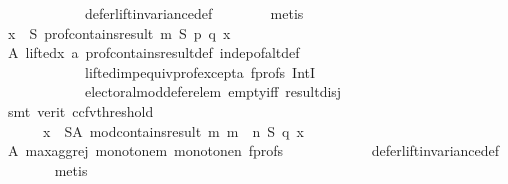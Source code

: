 \begin{isabellebody}
\ \ \ \ \ \ \ \ \ \ \ \ defer{\isacharunderscore}{\kern0pt}lift{\isacharunderscore}{\kern0pt}invariance{\isacharunderscore}{\kern0pt}def\isanewline
\ \ \ \ \ \ \isamarkupfalse%
\ metis\isanewline
\ \ \ \ \isamarkupfalse%
\ \isamarkupfalse%
\ {\isachardoublequoteopen}{\isasymforall}x\ {\isasymin}\ S{\isachardot}{\kern0pt}\ prof{\isacharunderscore}{\kern0pt}contains{\isacharunderscore}{\kern0pt}result\ m\ S\ p\ q\ x{\isachardoublequoteclose}\isanewline
\ \ \ \ \ \ \isamarkupfalse%
\ A\ lifted{\isacharunderscore}{\kern0pt}x\ a{}\ prof{\isacharunderscore}{\kern0pt}contains{\isacharunderscore}{\kern0pt}result{\isacharunderscore}{\kern0pt}def\ indep{\isacharunderscore}{\kern0pt}of{\isacharunderscore}{\kern0pt}alt{\isacharunderscore}{\kern0pt}def\isanewline
\ \ \ \ \ \ \ \ \ \ \ \ lifted{\isacharunderscore}{\kern0pt}imp{\isacharunderscore}{\kern0pt}equiv{\isacharunderscore}{\kern0pt}prof{\isacharunderscore}{\kern0pt}except{\isacharunderscore}{\kern0pt}a\ f{\isacharunderscore}{\kern0pt}profs\ IntI\isanewline
\ \ \ \ \ \ \ \ \ \ \ \ electoral{\isacharunderscore}{\kern0pt}mod{\isacharunderscore}{\kern0pt}defer{\isacharunderscore}{\kern0pt}elem\ empty{\isacharunderscore}{\kern0pt}iff\ result{\isacharunderscore}{\kern0pt}disj\isanewline
\ \ \ \ \ \ \isamarkupfalse%
\ {\isacharparenleft}{\kern0pt}smt\ {\isacharparenleft}{\kern0pt}verit{\isacharcomma}{\kern0pt}\ ccfv{\isacharunderscore}{\kern0pt}threshold{\isacharparenright}{\kern0pt}{\isacharparenright}{\kern0pt}\isanewline
\ \ \ \ \isamarkupfalse%
\ \isamarkupfalse%
\isanewline
\ \ \ \ \ \ {\isachardoublequoteopen}{\isasymforall}x\ {\isasymin}\ S{\isacharminus}{\kern0pt}A{\isachardot}{\kern0pt}\ mod{\isacharunderscore}{\kern0pt}contains{\isacharunderscore}{\kern0pt}result\ m\ {\isacharparenleft}{\kern0pt}m\ {\isasymparallel}\isactrlsub {\isasymup}\ n{\isacharparenright}{\kern0pt}\ S\ q\ x{\isachardoublequoteclose}\isanewline
\ \ \ \ \ \ \isamarkupfalse%
\ A\ max{\isacharunderscore}{\kern0pt}agg{\isacharunderscore}{\kern0pt}rej{}\ monotone{\isacharunderscore}{\kern0pt}m\ monotone{\isacharunderscore}{\kern0pt}n\ f{\isacharunderscore}{\kern0pt}profs\isanewline
\ \ \ \ \ \ \ \ \ \ \ \ defer{\isacharunderscore}{\kern0pt}lift{\isacharunderscore}{\kern0pt}invariance{\isacharunderscore}{\kern0pt}def\isanewline
\ \ \ \ \ \ \isamarkupfalse%
\ metis\isanewline
\ \ \ \ \isamarkupfalse%
\ \isamarkupfalse%
\ {}{}{\isacharcolon}{\kern0pt}\isanewline

\end{isabellebody}
